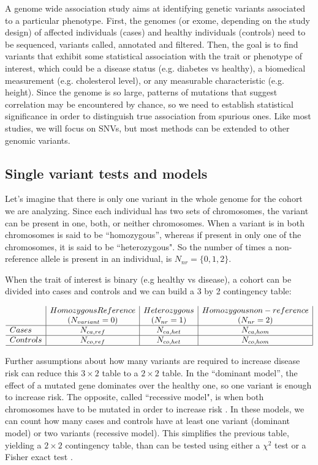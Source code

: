 A genome wide association study aims at identifying genetic variants associated to a particular phenotype. First, the genomes (or exome, depending on the study design) of affected individuals (cases) and healthy individuals (controls) need to be sequenced, variants called, annotated and filtered. Then, the goal is to find variants that exhibit some statistical association with the trait or phenotype of interest, which could be a disease status (e.g. diabetes vs healthy), a biomedical measurement (e.g. cholesterol level), or any measurable characteristic (e.g. height). Since the genome is so large, patterns of mutations that suggest correlation may be encountered by chance, so we need to establish statistical significance in order to distinguish true association from spurious ones. Like most studies, we will focus on SNVs, but most methods can be extended to other genomic variants.

\subsection{Single variant tests and models}

Let's imagine that there is only one variant in the whole genome for the cohort we are analyzing. Since each individual has two sets of chromosomes, the variant can be present in one, both, or neither chromosomes. When a variant is in both chromosomes is said to be ``homozygous'', whereas if present in only one of the chromosomes, it is said to be ``heterozygous". So the number of times a non-reference allele is present in an individual, is $ N_{nr} = \{0, 1,2\}$.

When the trait of interest is binary (e.g healthy vs disease), a cohort can be divided into cases and controls and we can build a 3 by 2 contingency table:

\[
\begin{array}{l|c|c|c|}
	& Homozygous Reference & Heterozygous & Homozygous non-reference\\
	& (N_{variant} = 0) & (N_{nr} = 1) & (N_{nr} = 2) \\
    \hline 
    Cases & N_{ca,ref} & N_{ca,het} & N_{ca,hom} \\ 
    \hline 
    Controls & N_{co,ref} & N_{co,het} & N_{co,hom} \\
    \hline 
\end{array} 
\]

Further assumptions about how many variants are required to increase disease risk can reduce this $3 \times 2$ table to a $2 \times 2$ table. In the ``dominant model'', the effect of a mutated gene dominates over the healthy one, so one variant is enough to increase risk. The opposite, called ``recessive model", is when both chromosomes have to be mutated in order to increase risk \cite{balding2006tutorial, clarke2011basic}. In these models, we can count how many cases and controls have at least one variant (dominant model) or two variants (recessive model). This simplifies the previous table, yielding a $2 \times 2$ contingency table, than can be tested using either a $\chi^2$ test or a Fisher exact test \cite{balding2006tutorial}.

